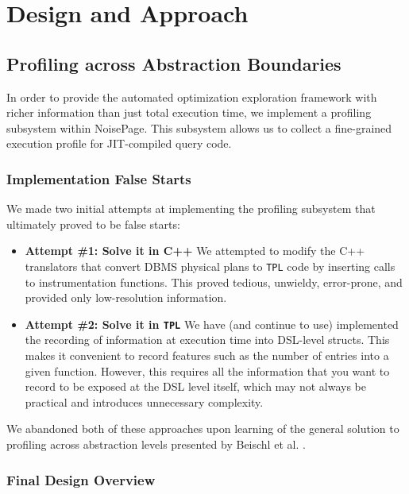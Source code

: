 \documentclass{vldb}
\newcommand{\tpl}{\texttt{TPL}\xspace}
\begin{document}

\section{Design and Approach}

\subsection{Profiling across Abstraction Boundaries}

In order to provide the automated optimization exploration framework with richer information than just total execution time, we implement a profiling subsystem within NoisePage. This subsystem allows us to collect a fine-grained execution profile for JIT-compiled query code.

\subsubsection{Implementation False Starts}

We made two initial attempts at implementing the profiling subsystem that ultimately proved to be false starts:

\begin{itemize}
    \item \textbf{Attempt \#1: Solve it in C++} We attempted to modify the C++ translators that convert DBMS physical plans to \tpl code by inserting calls to instrumentation functions. This proved tedious, unwieldy, error-prone, and provided only low-resolution information. 
    \item \textbf{Attempt \#2: Solve it in \tpl} We have (and continue to use) implemented the recording of information at execution time into DSL-level structs. This makes it convenient to record features such as the number of entries into a given function. However, this requires all the information that you want to record to be exposed at the DSL level itself, which may not always be practical and introduces unnecessary complexity.
\end{itemize}

We abandoned both of these approaches upon learning of the general solution to profiling across abstraction levels presented by Beischl et al. \cite{beischl21}.

\subsubsection{Final Design Overview}
\end{document}
